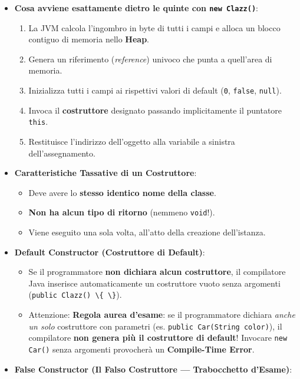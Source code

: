 \documentclass[11pt,a4paper]{article}
\newcommand{\passthrough}[1]{#1}
\providecommand{\tightlist}{\setlength{\itemsep}{0pt}\setlength{\parskip}{0pt}}
\begin{document}
\begin{itemize}
\tightlist
\item
  \textbf{Cosa avviene esattamente dietro le quinte con
  \passthrough{\lstinline!new Clazz()!}}:

  \begin{enumerate}
  \def\labelenumi{\arabic{enumi}.}
  \tightlist
  \item
    La JVM calcola l'ingombro in byte di tutti i campi e alloca un
    blocco contiguo di memoria nello \textbf{Heap}.
  \item
    Genera un riferimento (\emph{reference}) univoco che punta a
    quell'area di memoria.
  \item
    Inizializza tutti i campi ai rispettivi valori di default
    (\passthrough{\lstinline!0!}, \passthrough{\lstinline!false!},
    \passthrough{\lstinline!null!}).
  \item
    Invoca il \textbf{costruttore} designato passando implicitamente il
    puntatore \passthrough{\lstinline!this!}.
  \item
    Restituisce l'indirizzo dell'oggetto alla variabile a sinistra
    dell'assegnamento.
  \end{enumerate}
\item
  \textbf{Caratteristiche Tassative di un Costruttore}:

  \begin{itemize}
  \tightlist
  \item
    Deve avere lo \textbf{stesso identico nome della classe}.
  \item
    \textbf{Non ha alcun tipo di ritorno} (nemmeno
    \passthrough{\lstinline!void!}!).
  \item
    Viene eseguito una sola volta, all'atto della creazione
    dell'istanza.
  \end{itemize}
\item
  \textbf{Default Constructor (Costruttore di Default)}:

  \begin{itemize}
  \tightlist
  \item
    Se il programmatore \textbf{non dichiara alcun costruttore}, il
    compilatore Java inserisce automaticamente un costruttore vuoto
    senza argomenti (\passthrough{\lstinline!public Clazz() \{ \}!}).
  \item
    Attenzione: \textbf{Regola aurea d'esame}: se il programmatore
    dichiara \emph{anche un solo} costruttore con parametri (es.
    \passthrough{\lstinline!public Car(String color)!}), il compilatore
    \textbf{non genera più il costruttore di default}! Invocare
    \passthrough{\lstinline!new Car()!} senza argomenti provocherà un
    \textbf{Compile-Time Error}.
  \end{itemize}
\item
  \textbf{False Constructor (Il Falso Costruttore --- Trabocchetto
  d'Esame)}:


\end{itemize}
\end{document}
